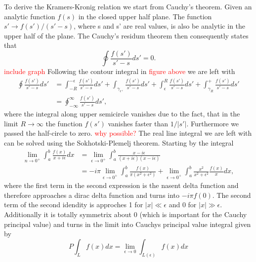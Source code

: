\documentclass[11pt,a4paper]{article}
\begin{document}
To derive the Kramers-Kronig relation we start from Cauchy's theorem. Given an analytic function $f(s)$ in the closed upper half plane. The function $s' \rightarrow f(s') / (s' - s)$, where s and s' are real values, is also be analytic in the upper half of the plane. The Cauchy's residum theorem then consequently states that
\begin{equation}
	\oint \frac{f(s')}{s'-s} ds' = 0.
\end{equation}
\textcolor{red}{include graph}
Following the contour integral in \textcolor{red}{figure above} we are left with
\begin{equation}
\begin{split}
	\oint \frac{f(s')}{s'-s}ds' &= \int_{-R}^{-\epsilon} \frac{f(s')}{s'-s}ds' + \int_{\gamma_{\epsilon^+}} \frac{f(s')}{s'-s}ds' + \int_\epsilon^R \frac{f(s')}{s'-s}ds' + \int_{\gamma_R}^+ \frac{f(s')}{s'-s}ds' \\
	&= \oint_{-\infty}^{\infty} \frac{f(s')}{s'-s}ds',
\end{split}
\end{equation}
where the integral along upper semicircle vanishes due to the fact, that in the limit $R \rightarrow \infty$ the function $f(s')$ vanishes faster than $1/|s'|$. Furthermore we passed the half-circle to zero. \textcolor{red}{why possible?} The real line integral we are left with can be solved using the Sokhotski-Plemelj theorem. Starting by the integral
\begin{equation}
\begin{split}
	\lim_{n \to 0^+} \int_a^b \frac{f(x)}{x+i\epsilon}dx &= \lim_{\epsilon \to 0^+} \int_a^b \frac{x-i\epsilon}{(x+i\epsilon)(x-i\epsilon)} \\ 
	 &= -i\pi \lim_{\epsilon \to 0^+} \int_a^b \frac{f(x)}{\pi (x^2 + \epsilon^2)} + \lim_{\epsilon \to 0^+} \int_a^b \frac{x^2}{x^2 + \epsilon^2} \frac{f(x)}{x} dx,
\end{split}
\end{equation} 
where the first term in the second expression is the nasent delta function and therefore approaches a dirac delta function and turns into $-i\pi f(0)$. The second term of the second idendity is approches 1 for $|x| \ll \epsilon$ and 0 for $|x| \gg \epsilon$. Additionally it is totally symmetrix about 0 (which is important for the Cauchy principal value) and turns in the limit into Cauchys principal value integral given by
\begin{equation}	
 P \int_L f(x) dx = \lim_{\epsilon \to 0} \int_{L(\epsilon)} f(x) dx
\end{equation}
\end{document}
